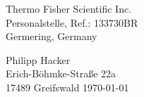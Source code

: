 \documentclass[11pt,a4paper]{moderncv}
\begin{document}
    \vspace*{1.0cm}
    \begin{minipage}{0.6\textwidth}
        \begin{flushleft}
            Thermo Fisher Scientific Inc.\\%
            Personalstelle, Ref.: 133730BR\\%
            Germering, Germany
        \end{flushleft}
    \end{minipage}
    \hfill
    \begin{minipage}{0.3\textwidth}
        \begin{flushright}
            Philipp Hacker\\%
            Erich-Böhmke-Straße 22a\\%
            17489 Greifswald
            \today
        \end{flushright}
    \end{minipage}
\end{document}
